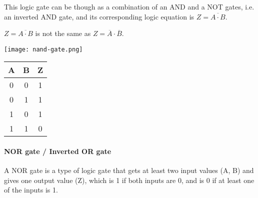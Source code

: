 This logic gate can be though as a combination of an AND and a NOT gates, i.e. an inverted AND gate, and its corresponding logic equation is $Z = \overline{A\cdot B}$.
\begin{note}
    $Z = \overline{A\cdot B}$ is not the same as $Z = \overline{A}\cdot\overline{B}$.
\end{note}

\begin{minipage}{\textwidth}
\vspace{1cm}
\begin{minipage}[c]{0.49\textwidth}
    \centering
    \texttt{[image: nand-gate.png]}
\end{minipage}
\hfill
\begin{minipage}[c]{.49\textwidth}
    \centering
    \begin{tabular}{ |c|c|c| } \hline 
        \textbf{A} & \textbf{B} & \textbf{Z} \\ \hline
        0 & 0 & 1 \\
        0 & 1 & 1 \\
        1 & 0 & 1 \\
        1 & 1 & 0 \\
        \hline
    \end{tabular}
\end{minipage}
\end{minipage}


\paragraph{NOR gate / Inverted OR gate}
\begin{definition}
    A NOR gate is a type of logic gate that gets at least two input values (A, B) and gives one output value (Z), which is 1 if both inputs are 0, and is 0 if at least one of the inputs is 1.
\end{definition}


